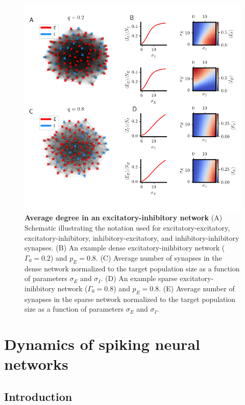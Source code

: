 \documentclass{ucetd}
\begin{document}
\clearpage
\begin{figure}[t!]
\centering
\includegraphics[width=165mm]{fig_10}
\caption{\textbf{Average degree in an excitatory-inhibitory network} (A) Schematic illustrating the notation used for excitatory-excitatory, excitatory-inhibitory, inhibitory-excitatory, and inhibitory-inhibitory synapses. (B) An example dense excitatory-inihbitory network ($\Gamma_{0}=0.2$) and $p_{E} = 0.8$. (C) Average number of synapses in the dense network normalized to the target population size as a function of parameters $\sigma_{E}$ and $\sigma_{I}$. (D) An example sparse excitatory-inihbitory network ($\Gamma_{0}=0.8$) and $p_{E} = 0.8$. (E) Average number of synapses in the sparse network normalized to the target population size as a function of parameters $\sigma_{E}$ and $\sigma_{I}$.}
\end{figure}

\chapter{Dynamics of spiking neural networks}

\section{Introduction}
\end{document}
